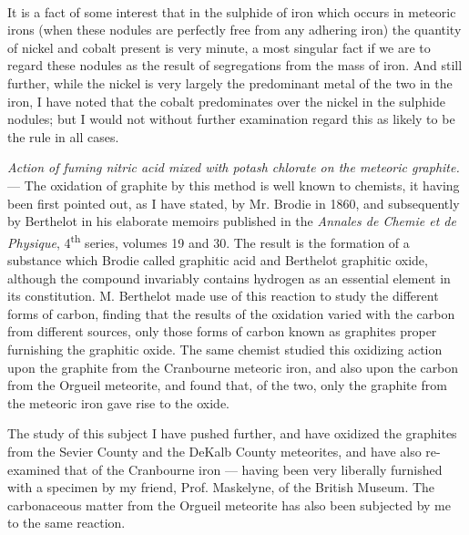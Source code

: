 \documentclass[a4paper, 11pt, oneside, english]{article}
\begin{document}
\paragraph{}
It is a fact of some interest that in the sulphide of iron which occurs in meteoric irons (when these nodules are perfectly free from any adhering iron) the quantity of nickel and cobalt present is very minute, a most singular fact if we are to regard these nodules as the result of segregations from the mass of iron. And still further, while the nickel is very largely the predominant metal of the two in the iron, I have noted that the cobalt predominates over the nickel in the sulphide nodules; but I would not without further examination regard this as likely to be the rule in all cases.

\emph{Action of fuming nitric acid mixed with potash chlorate on the meteoric graphite.} --- The oxidation of graphite by this method is well known to chemists, it having been first pointed out, as I have stated, by Mr. Brodie in 1860, and subsequently by Berthelot in his elaborate memoirs published in the \emph{Annales de Chemie et de Physique}, 4\textsuperscript{th} series, volumes 19 and 30. The result is the formation of a substance which Brodie called graphitic acid and Berthelot graphitic oxide, although the compound invariably contains hydrogen as an essential element in its constitution. M. Berthelot made use of this reaction to study the different forms of carbon, finding that the results of the oxidation varied with the carbon from different sources, only those forms of carbon known as graphites proper furnishing the graphitic oxide. The same chemist studied this oxidizing action upon the graphite from the Cranbourne meteoric iron, and also upon the carbon from the Orgueil meteorite, and found that, of the two, only the graphite from the meteoric iron gave rise to the oxide.

The study of this subject I have pushed further, and have oxidized the graphites from the Sevier County and the DeKalb County meteorites, and have also re-examined that of the Cranbourne iron --- having been very liberally furnished with a specimen by my friend, Prof. Maskelyne, of the British Museum. The carbonaceous matter from the Orgueil meteorite has also been subjected by me to the same reaction.
\end{document}
